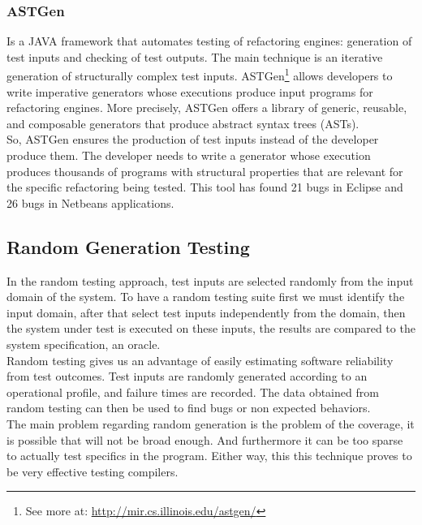 \documentclass[10pt, conference, compsocconf]{IEEEtran}
\begin{document}
\subsubsection{\textbf{ASTGen}\cite{Daniel:2007:ATR:1287624.1287651}} Is a JAVA framework that automates testing of refactoring engines: generation of test inputs
and checking of test outputs. The main technique is an iterative generation of structurally complex test inputs.
ASTGen\footnote{See more at: \url{http://mir.cs.illinois.edu/astgen/}} allows developers to write imperative generators whose executions
produce input programs for refactoring engines. More precisely, ASTGen
offers a library of generic, reusable, and composable generators that produce abstract syntax trees (ASTs).\\
So, ASTGen ensures the production of test inputs instead of the developer produce them. The developer needs to write a generator whose execution
produces thousands of programs with structural properties that are relevant for the specific refactoring being tested. This tool has found
21 bugs in Eclipse and 26 bugs in Netbeans applications.

\subsection{Random Generation Testing}
In the random testing approach, test inputs are selected randomly from the input domain of the system.
To have a random testing suite first we must identify the input domain, after that select test inputs independently from the domain,
then the system under test is executed on these inputs, the results are compared to the system specification, an oracle.\\
Random testing gives us an advantage of easily estimating software reliability from test outcomes.
Test inputs are randomly generated according to an operational profile, and failure times are recorded.
The data obtained from random testing can then be used to find bugs or non expected behaviors.\\

The main problem regarding random generation is the problem of the coverage, it is possible that will not be broad enough. And furthermore it can be
too sparse to actually test specifics in the program. Either way, this this technique proves to be very effective testing compilers.
\end{document}
